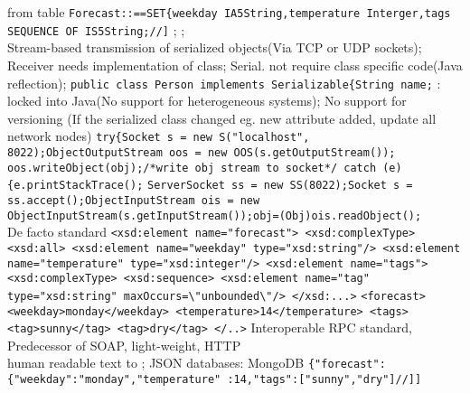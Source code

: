 from table
\lstinline{Forecast::==SET{weekday IA5String,temperature Interger,tags SEQUENCE OF IS5String;//]}
;
;
%
%
%
\\
Stream-based transmission of serialized objects(Via TCP or UDP sockets);
Receiver needs implementation of class;
Serial. not require class specific code(Java reflection);
\textbar
\lstinline{public class Person implements Serializable{String name;}
\btext{--}:
locked into Java(No support for heterogeneous systems);
No support for versioning
(If the serialized class changed eg. new attribute added, update all network nodes)
\lstinline{try{Socket s = new S("localhost", 8022);ObjectOutputStream oos = new OOS(s.getOutputStream()); oos.writeObject(obj);/*write obj stream to socket*/ catch (e) {e.printStackTrace();}
\lstinline{ServerSocket ss = new SS(8022);Socket s = ss.accept();ObjectInputStream ois = new ObjectInputStream(s.getInputStream());obj=(Obj)ois.readObject();}
%
%
%
\\
De facto standard
\lstinline{<xsd:element name="forecast"> <xsd:complexType> <xsd:all> <xsd:element name="weekday" type="xsd:string"/> <xsd:element name="temperature" type="xsd:integer"/> <xsd:element name="tags"><xsd:complexType> <xsd:sequence> <xsd:element name="tag" type="xsd:string" maxOccurs=\"unbounded\"/> </xsd:...>}
\lstinline{<forecast> <weekday>monday</weekday> <temperature>14</temperature> <tags> <tag>sunny</tag> <tag>dry</tag> </..>}
Interoperable RPC standard,
Predecessor of SOAP,
light-weight,
HTTP
%
%
%
\\
human readable text to ;
JSON databases: MongoDB
\lstinline{{"forecast":{"weekday":"monday","temperature" :14,"tags":["sunny","dry"]//]]}
